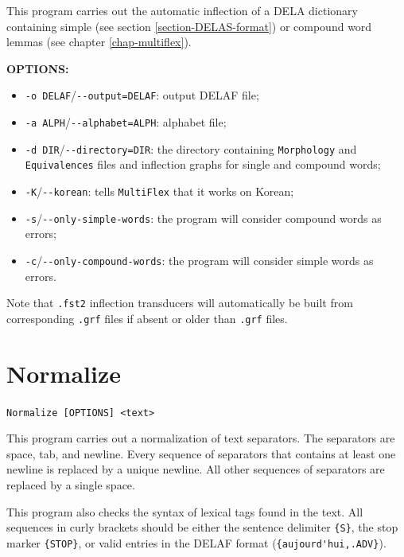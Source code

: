 \bigskip
\noindent {}This 
program carries out the automatic inflection of a DELA dictionary 
containing simple (see section \ref{section-DELAS-format}) or compound word
lemmas (see chapter \ref{chap-multiflex}).

\bigskip
\noindent \textbf{OPTIONS:}
\begin{itemize}
  \item \verb+-o DELAF+/\verb+--output=DELAF+: output DELAF file;
  \item \verb+-a ALPH+/\verb+--alphabet=ALPH+: alphabet file;
  \item \verb+-d DIR+/\verb+--directory=DIR+: the directory containing
  \verb+Morphology+ and \verb+Equivalences+ files and inflection graphs for
                                              single and compound words;
  \item \verb+-K+/\verb+--korean+: tells \verb+MultiFlex+ that it works on
  Korean;
  \item \verb+-s+/\verb+--only-simple-words+: the program will consider
  compound words as errors;
  \item \verb+-c+/\verb+--only-compound-words+: the program will consider
  simple words as errors.
\end{itemize}

\bigskip
\noindent Note that \verb+.fst2+ inflection transducers will automatically be
built from corresponding \verb+.grf+ files if absent or older than \verb+.grf+
files.







\section{Normalize}
\verb+Normalize [OPTIONS] <text>+

\bigskip
\noindent {}This 
program carries out a normalization of text separators. The separators are
space, tab, and newline. Every sequence of separators that contains at least one
newline is replaced by a unique newline. All other sequences of separators are
replaced by a single space.

\bigskip
\noindent This program also checks the syntax of lexical tags found in the text. All
sequences in curly brackets should be either the sentence delimiter \verb+{S}+,
the stop marker \verb+{STOP}+, or valid entries in the DELAF format (\verb+{aujourd'hui,.ADV}+). 

